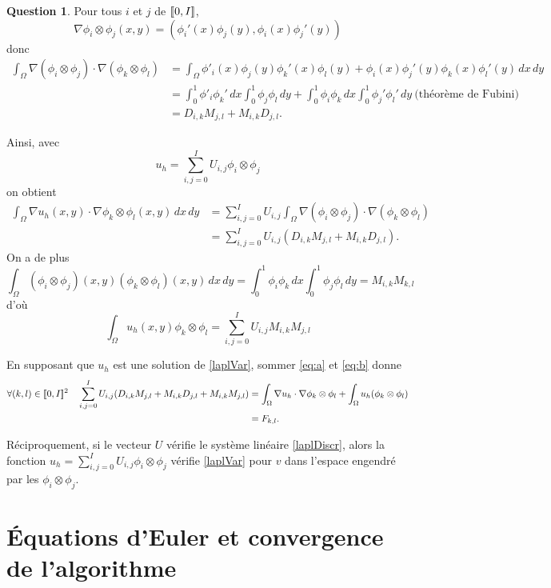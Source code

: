 \documentclass[11pt]{article}
\DeclarePairedDelimiter{\zintcc}{[\![}{]\!]}
\theoremstyle{definition}
\newtheorem{ques}{Question}
\begin{document}
\begin{ques}
Pour tous $i$ et $j$ de $\zintcc{0,I}$,
\[
\nabla \phi_i\otimes\phi_j (x,y) = \left(
\phi_i'(x)\phi_j(y), \phi_i(x)\phi_j'(y)
\right)
\]
donc 
\begin{align*}
\int_{\Omega}\nabla(\phi_i\otimes\phi_j)\cdot\nabla(\phi_k\otimes\phi_l) 
&=
\int_{\Omega} \phi'_i(x)\phi_j(y)\phi_k'(x)\phi_l(y) + \phi_i(x)\phi_j'(y)\phi_k(x)\phi_l'(y)\,dx\,dy \\
&= \int_{0}^{1}\phi'_i\phi_k'\,dx\int_0^1\phi_j\phi_l\,dy + \int_{0}^{1}\phi_i\phi_k\,dx\int_0^1\phi_j'\phi_l'\,dy\ \text{(théorème de Fubini)} \\
&= D_{i,k}M_{j,l} + M_{i,k}D_{j,l}.
\end{align*}

Ainsi, avec
\[
u_h = \sum_{i,j=0}^{I}U_{i,j}\phi_i\otimes\phi_j
\]
on obtient
\begin{align*}\tag{a}\label{eq:a}
\int_{\Omega} \nabla u_h(x,y)\cdot \nabla \phi_k\otimes\phi_l (x,y)\,dx\,dy 
&= \sum_{i,j=0}^{I}U_{i,j} \int_\Omega\nabla(\phi_i\otimes\phi_j)\cdot\nabla(\phi_k\otimes\phi_l) \\
&= \sum_{i,j=0}^{I}U_{i,j} (D_{i,k}M_{j,l}+M_{i,k}D_{j,l}).
\end{align*}
On a de plus
\[
\int_\Omega (\phi_i\otimes\phi_j)(x,y)(\phi_k\otimes\phi_l)(x,y)\,dx\,dy = \int_0^1 \phi_i \phi_k\,dx \int_0^1 \phi_j \phi_l\,dy = M_{i,k}M_{k,l}
\]
d'où
\begin{equation}\tag{b}\label{eq:b}
\int_\Omega u_h(x,y)\phi_k\otimes\phi_l = \sum_{i,j=0}^{I}U_{i,j}M_{i,k}M_{j,l}
\end{equation}

En supposant que $u_h$ est une solution de \eqref{laplVar}, sommer \eqref{eq:a} et \eqref{eq:b} donne
\begin{align}\label{laplDiscr}
\forall (k,l)\in \zintcc{0,I}^2\quad
\sum_{i,j=0}^{I}U_{i,j}(D_{i,k}M_{j,l} + M_{i,k}D_{j,l} + M_{i,k}M_{j,l}) &=
\int_\Omega\nabla u_h\cdot \nabla\phi_k\otimes\phi_l + \int_\Omega u_h (\phi_k\otimes\phi_l) \nonumber \\
&= F_{k,l}.
\end{align}


Réciproquement, si le vecteur $U$ vérifie le système linéaire \eqref{laplDiscr}, alors la fonction $u_h = \sum_{i,j=0}^{I}U_{i,j}\phi_i\otimes\phi_j$ vérifie \eqref{laplVar} pour $v$ dans l'espace engendré par les $\phi_i\otimes\phi_j$.



\end{ques}





\section{Équations d'Euler et convergence de l'algorithme}
\end{document}
